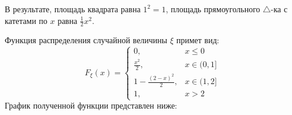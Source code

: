 \begin{figure}[H]
\end{figure}
В результате, площадь квадрата равна $1^2=1$, площадь прямоугольного $\triangle$-ка с катетами по $x$ равна $\frac{1}{2}x^2$.

Функция распределения случайной величины $\xi$ примет вид:
\[
F_{\xi} (x) =
\begin{cases}
	0, &x \le 0 \\
	\frac{x^2}{2}, &x \in (0,1] \\
	1 - \frac{(2-x)^2}{2}, &x \in (1,2] \\
	1, &x>2
\end{cases}
\]
График полученной функции представлен ниже:
\begin{figure}[H]
\end{figure}

